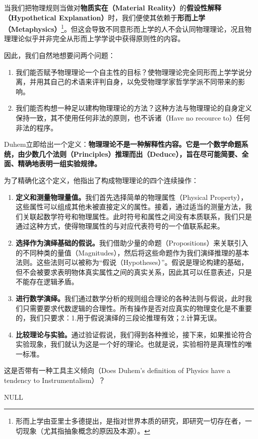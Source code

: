 \documentclass[12pt, a4paper, oneside]{ctexart}
\renewcommand{\b}{\textbf}
\newcommand{\f}{\footnote}
\newcommand{\q}[1]{\begin{questionbox}{}#1\end{questionbox}}
\newcommand{\ans}[1]{\begin{ansbox}{}#1\end{ansbox}}
\newcounter{question}[section]
\newcounter{ans}[section]
\begin{document}
当我们把物理规则当做对\b{物质实在（Material Reality）}的\b{假设性解释（Hypothetical Explanation）}时，我们便使其依赖于\b{形而上学（Metaphysics）}\f{形而上学由亚里士多德提出，是指对世界本质的研究，即研究一切存在者，一切现象（尤其指抽象概念的原因及本源）。}。但这会导致不同意形而上学的人不会认同物理理论，况且物理理论似乎并非完全从形而上学学说中获得原则性的内容。

因此，我们自然地想要问两个问题：
\begin{enumerate}
    \item 我们能否赋予物理理论一个自主性的目标？使物理理论完全同形而上学学说分离，并用其自己的术语来评判自身，以免受物理学家哲学学派不同带来的影响。
    \item 我们能否构想一种足以建构物理理论的方法？这种方法与物理理论的自身定义保持一致，其不使用任何非法的原则，也不诉诸（Have no recource to）任何非法的程序。
\end{enumerate}
Duhem立即给出一个定义：\b{物理理论不是一种解释性内容。它是一个数学命题系统，由少数几个法则（Principles）推理而出（Deduce），旨在尽可能简要、全面、精确地表明一组实验规律。}

为了精确化这个定义，他指出了构成物理理论的四个连续操作：
\begin{enumerate}
    \item \b{定义和测量物理量值。}我们首先选择简单的物理属性（Physical Property），这些属性可以组成其他未被直接定义的属性。接着，通过适当的测量方法，我们关联起数学符号和物理属性。此时符号和属性之间没有本质联系，我们只是通过这种方式，使得物理属性的与对应代表符号的一个值联系起来。
    \item \b{选择作为演绎基础的假说。}我们借助少量的命题（Propositions）来关联引入的不同种类的量值（Magnitudes），然后将这些命题作为我们演绎推理的基本法则。这些法则可以被称为“假说（Hypotheses）”。假说是理论构建的基础，但不会被要求表明物体真实属性之间的真实关系，因此其可以任意表述，只是不能存在逻辑矛盾。
    \item \b{进行数学演绎。}我们通过数学分析的规则组合理论的各种法则与假说，此时我们只需要要求代数逻辑的合理性。所有操作是否对应真实的物理变化是不重要的，我们只要求：1.用于假说演绎的三段论推理有效；2.计算无误。
    \item \b{比较理论与实验。}通过验证假说，我们得到各种推论，接下来，如果推论符合实验现象，我们就认为这是一个好的理论。也就是说，实验相符是真理性的唯一标准。
\end{enumerate}

\q{这是否带有一种工具主义倾向（Does Duhem’s definition of Physics have a tendency to Instrumentalism）？}
\ans{NULL}
\end{document}
